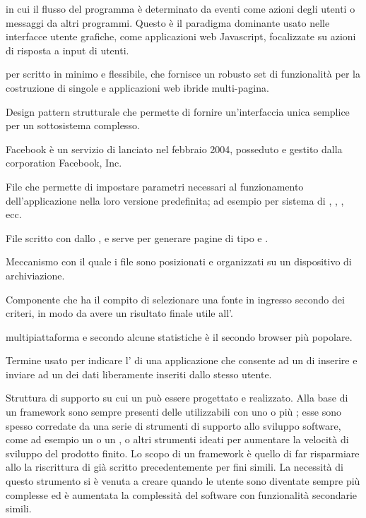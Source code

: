 { in cui il flusso del programma è determinato da eventi come azioni degli utenti o messaggi da altri programmi. Questo è il paradigma dominante usato nelle interfacce utente grafiche, come applicazioni web Javascript, focalizzate su azioni di risposta a input di utenti.}


{ per  scritto in  minimo e flessibile, che fornisce un robusto set di funzionalità per la costruzione di singole e applicazioni web ibride multi-pagina.}




{Design pattern strutturale che permette di fornire un'interfaccia unica semplice per un sottosistema complesso.}


{Facebook è un servizio di  lanciato nel febbraio 2004, posseduto e gestito dalla corporation Facebook, Inc.}

{File che permette di impostare parametri necessari al funzionamento dell'applicazione nella loro versione predefinita; ad esempio  per sistema di , , , ecc.}

{File scritto con   dallo , e serve per generare pagine di tipo  e .}

{Meccanismo con il quale i file sono posizionati e organizzati su un dispositivo di archiviazione.}

{Componente che ha il compito di selezionare una fonte in ingresso secondo dei criteri, in modo da avere un risultato finale utile all'.}

{  multipiattaforma e secondo alcune statistiche è il secondo browser più popolare.}

{Termine usato per indicare l' di una applicazione che consente ad un  di inserire e inviare ad un  dei dati liberamente inseriti dallo stesso utente.}

{Struttura di supporto su cui un  può essere progettato e realizzato. Alla base di un framework sono sempre presenti delle  utilizzabili con uno o più ; esse sono spesso corredate da una serie di strumenti di supporto allo sviluppo software, come ad esempio un  o un , o altri strumenti ideati per aumentare la velocità di sviluppo del prodotto finito.
Lo scopo di un framework è quello di far risparmiare allo  la riscrittura di  già scritto precedentemente per fini simili. La necessità di questo strumento si è venuta a creare quando le  utente sono diventate sempre più complesse ed è aumentata la complessità del software con funzionalità secondarie simili.}

